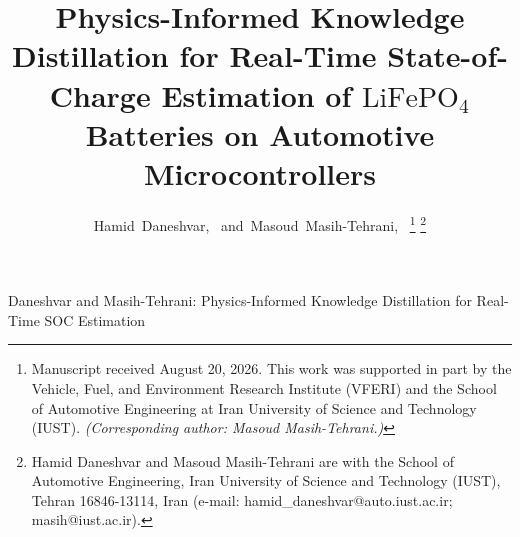 \title{Physics-Informed Knowledge Distillation for Real-Time State-of-Charge Estimation of $\text{LiFePO}_4$ Batteries on Automotive Microcontrollers}

\author{Hamid~Daneshvar,~
	and~Masoud~Masih-Tehrani,~%
	\thanks{Manuscript received August 20, 2026. This work was supported in part by the Vehicle, Fuel, and Environment Research Institute (VFERI) and the School of Automotive Engineering at Iran University of Science and Technology (IUST). \textit{(Corresponding author: Masoud Masih-Tehrani.)}}%
	\thanks{Hamid Daneshvar and Masoud Masih-Tehrani are with the School of Automotive Engineering, Iran University of Science and Technology (IUST), Tehran 16846-13114, Iran (e-mail: hamid\_daneshvar@auto.iust.ac.ir; masih@iust.ac.ir).}}

%
{Daneshvar and Masih-Tehrani: Physics-Informed Knowledge Distillation for Real-Time SOC Estimation}

\maketitle

